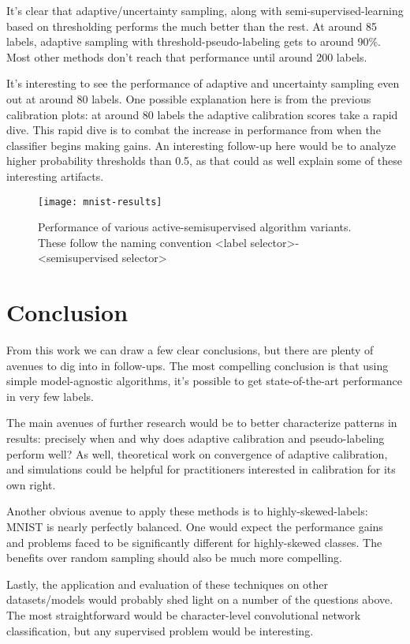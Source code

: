 \documentclass{article}
\begin{document}
It's clear that adaptive/uncertainty sampling, along with semi-supervised-learning based on thresholding performs the much better than the rest.  At around 85 labels, adaptive sampling with threshold-pseudo-labeling gets to around 90\%.  Most other methods don't reach that performance until around 200 labels.  

It's interesting to see the performance of adaptive and uncertainty sampling even out at around 80 labels.  One possible explanation here is from the previous calibration plots: at around 80 labels the adaptive calibration scores take a rapid dive.  This rapid dive is to combat the increase in performance from when the classifier begins making gains.  An interesting follow-up here would be to analyze higher probability thresholds than 0.5, as that could as well explain some of these interesting artifacts.  



\begin{figure}[h]
  \center 
  \texttt{[image: mnist-results]}
  \caption{Performance of various active-semisupervised algorithm variants.  These follow the naming convention <label selector>-<semisupervised selector>}
\end{figure}

\section{Conclusion}
From this work we can draw a few clear conclusions, but there are plenty of avenues to dig into in follow-ups.  The most compelling conclusion is that using simple model-agnostic algorithms, it's possible to get state-of-the-art performance in very few labels.  

The main avenues of further research would be to better characterize patterns in results: precisely when and why does adaptive calibration and pseudo-labeling perform well?  As well, theoretical work on convergence of adaptive calibration, and simulations could be helpful for practitioners interested in calibration for its own right.

Another obvious avenue to apply these methods is to highly-skewed-labels: MNIST is nearly perfectly balanced.  One would expect the performance gains and problems faced to be significantly different for highly-skewed classes.  The benefits over random sampling should also be much more compelling.  

Lastly, the application and evaluation of these techniques on other datasets/models would probably shed light on a number of the questions above.  The most straightforward would be character-level convolutional network classification, but any supervised problem would be interesting.  
\end{document}
